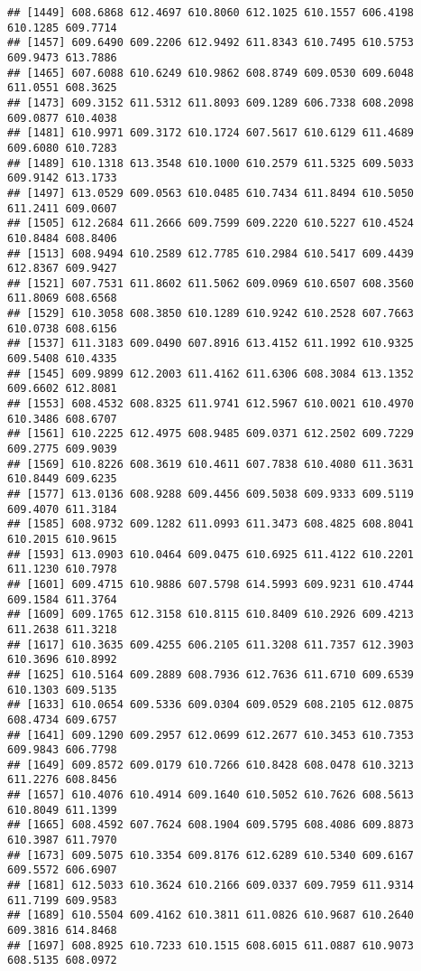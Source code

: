 \documentclass[
]{article}
\begin{document}
\begin{verbatim}
## [1449] 608.6868 612.4697 610.8060 612.1025 610.1557 606.4198 610.1285 609.7714
## [1457] 609.6490 609.2206 612.9492 611.8343 610.7495 610.5753 609.9473 613.7886
## [1465] 607.6088 610.6249 610.9862 608.8749 609.0530 609.6048 611.0551 608.3625
## [1473] 609.3152 611.5312 611.8093 609.1289 606.7338 608.2098 609.0877 610.4038
## [1481] 610.9971 609.3172 610.1724 607.5617 610.6129 611.4689 609.6080 610.7283
## [1489] 610.1318 613.3548 610.1000 610.2579 611.5325 609.5033 609.9142 613.1733
## [1497] 613.0529 609.0563 610.0485 610.7434 611.8494 610.5050 611.2411 609.0607
## [1505] 612.2684 611.2666 609.7599 609.2220 610.5227 610.4524 610.8484 608.8406
## [1513] 608.9494 610.2589 612.7785 610.2984 610.5417 609.4439 612.8367 609.9427
## [1521] 607.7531 611.8602 611.5062 609.0969 610.6507 608.3560 611.8069 608.6568
## [1529] 610.3058 608.3850 610.1289 610.9242 610.2528 607.7663 610.0738 608.6156
## [1537] 611.3183 609.0490 607.8916 613.4152 611.1992 610.9325 609.5408 610.4335
## [1545] 609.9899 612.2003 611.4162 611.6306 608.3084 613.1352 609.6602 612.8081
## [1553] 608.4532 608.8325 611.9741 612.5967 610.0021 610.4970 610.3486 608.6707
## [1561] 610.2225 612.4975 608.9485 609.0371 612.2502 609.7229 609.2775 609.9039
## [1569] 610.8226 608.3619 610.4611 607.7838 610.4080 611.3631 610.8449 609.6235
## [1577] 613.0136 608.9288 609.4456 609.5038 609.9333 609.5119 609.4070 611.3184
## [1585] 608.9732 609.1282 611.0993 611.3473 608.4825 608.8041 610.2015 610.9615
## [1593] 613.0903 610.0464 609.0475 610.6925 611.4122 610.2201 611.1230 610.7978
## [1601] 609.4715 610.9886 607.5798 614.5993 609.9231 610.4744 609.1584 611.3764
## [1609] 609.1765 612.3158 610.8115 610.8409 610.2926 609.4213 611.2638 611.3218
## [1617] 610.3635 609.4255 606.2105 611.3208 611.7357 612.3903 610.3696 610.8992
## [1625] 610.5164 609.2889 608.7936 612.7636 611.6710 609.6539 610.1303 609.5135
## [1633] 610.0654 609.5336 609.0304 609.0529 608.2105 612.0875 608.4734 609.6757
## [1641] 609.1290 609.2957 612.0699 612.2677 610.3453 610.7353 609.9843 606.7798
## [1649] 609.8572 609.0179 610.7266 610.8428 608.0478 610.3213 611.2276 608.8456
## [1657] 610.4076 610.4914 609.1640 610.5052 610.7626 608.5613 610.8049 611.1399
## [1665] 608.4592 607.7624 608.1904 609.5795 608.4086 609.8873 610.3987 611.7970
## [1673] 609.5075 610.3354 609.8176 612.6289 610.5340 609.6167 609.5572 606.6907
## [1681] 612.5033 610.3624 610.2166 609.0337 609.7959 611.9314 611.7199 609.9583
## [1689] 610.5504 609.4162 610.3811 611.0826 610.9687 610.2640 609.3816 614.8468
## [1697] 608.8925 610.7233 610.1515 608.6015 611.0887 610.9073 608.5135 608.0972

\end{verbatim}
\end{document}
